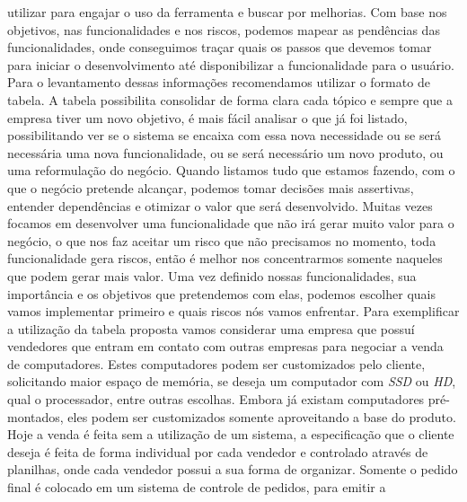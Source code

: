       utilizar para engajar o uso da ferramenta e buscar por melhorias. \newline
      Com base nos objetivos, nas funcionalidades e nos riscos, podemos mapear as
      pendências das funcionalidades, onde conseguimos traçar quais os passos que
      devemos tomar para iniciar o desenvolvimento até disponibilizar a funcionalidade
      para o usuário. \newline
      Para o levantamento dessas informações recomendamos utilizar o formato de
      tabela. A tabela possibilita consolidar de forma clara cada tópico e sempre
      que a empresa tiver um novo objetivo, é mais fácil analisar o que já foi listado,
      possibilitando ver se o sistema se encaixa com essa nova necessidade ou se será
      necessária uma nova funcionalidade, ou se será necessário um novo produto,
      ou uma reformulação do negócio. Quando listamos tudo que estamos fazendo,
      com o que o negócio pretende alcançar, podemos tomar decisões mais
      assertivas, entender dependências e otimizar o valor que será desenvolvido.
      Muitas vezes focamos em desenvolver uma funcionalidade que não irá gerar
      muito valor para o negócio, o que nos faz aceitar um risco que não precisamos
      no momento, toda funcionalidade gera riscos, então é melhor nos concentrarmos
      somente naqueles que podem gerar mais valor. \newline
      Uma vez definido nossas funcionalidades, sua importância e os objetivos que
      pretendemos com elas, podemos escolher quais vamos implementar primeiro e
      quais riscos nós vamos enfrentar. \newline
      Para exemplificar a utilização da tabela proposta vamos considerar uma
      empresa que possuí vendedores que entram em contato com outras empresas para
      negociar a venda de computadores. Estes computadores podem ser customizados
      pelo cliente, solicitando maior espaço de memória, se deseja um computador
      com \textit{SSD} ou \textit{HD}, qual o processador, entre outras escolhas.
      Embora já existam computadores pré-montados, eles podem ser customizados
      somente aproveitando a base do produto. \newline
      Hoje a venda é feita sem a utilização de um sistema, a especificação que o
      cliente deseja é feita de forma individual por cada vendedor e controlado
      através de planilhas, onde cada vendedor possui a sua forma de organizar. Somente
      o pedido final é colocado em um sistema de controle de pedidos, para emitir a

